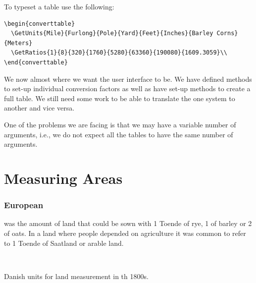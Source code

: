 \documentclass{tufte-book}
\makeatletter
\gdef\inUnitsValue{}
\gdef\outUnitsValue{}
\newif\if@debug
\def\test#1#2{
\if@debug{
  \convert{1}{#1}{#2}\\
   inUnitsValue=\inUnitsValue\\
   outUnitsValue=\outUnitsValue \\
   \convert{1}{#2}{#1}\\
   inUnitsValue=\inUnitsValue\\
   outUnitsValue=\outUnitsValue \\
  }
\fi}
\makeatother
\begin{document}




\test{Furlongs}{Poles}

To typeset a table use the following:

\begin{verbatim}
\begin{converttable}
  \GetUnits{Mile}{Furlong}{Pole}{Yard}{Feet}{Inches}{Barley Corns}{Meters}
  \GetRatios{1}{8}{320}{1760}{5280}{63360}{190080}{1609.3059}\\
\end{converttable}
\end{verbatim}

We now almost where we want the user interface to be. We have defined methods to set-up individual conversion factors as well as have set-up methods to create a full table. We still need some work to be able to translate the one system to another and vice versa.

One of the problems we are facing is that we may have a variable number of arguments, i.e., we do not expect all the tables to have the same number of arguments.

\bigskip







\chapter{Measuring Areas}

\subsection{European}


 was the amount of land that could be sown with 1 Toende of rye, 1 of barley or 2 of oats. In a land where  people depended on agriculture it was common to refer to 1 Toende of Saatland or arable land.

\begin{table}[htbp]
\vspace{1cm}
\begin{converttable}
\\
\end{converttable}
\caption{Danish units for land measurement in th 1800s.}
\end{table}
\end{document}

